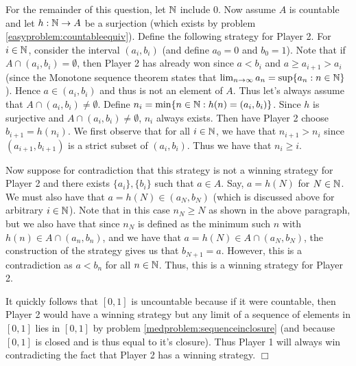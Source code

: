 \documentclass{article}
\begin{document}
{    For the remainder of this question, let $\mathbb{N}$ include 0. Now assume $A$ is countable and let $h: \mathbb{N}\to A$ be a surjection (which exists by problem \ref{easyproblem:countableequiv}). Define the following strategy for Player 2. For $i\in \mathbb{N}$, consider the interval $(a_{i}, b_{i})$ (and define $a_{0} = 0$ and $b_{0} = 1$). Note that if $A \cap (a_{i}, b_{i}) = \emptyset$, then Player 2 has already won since $a < b_{i}$ and $a \geq a_{i+1} > a_{i}$ (since the Monotone sequence theorem states that $\lim_{n\to\infty} a_{n} = \sup\{a_{n}:n\in\mathbb{N}\}$). Hence $a\in (a_{i}, b_{i})$ and thus is not an element of $A$. Thus let's always assume that $A\cap (a_{i}, b_{i})\neq \emptyset$. Define $n_{i} = \min\{n\in \mathbb{N}: h(n) = (a_{i}, b_{i})\}$. Since $h$ is surjective and $A\cap (a_{i}, b_{i})\neq \emptyset$, $n_{i}$ always exists. Then have Player 2 choose $b_{i+1} = h(n_{i})$. We first observe that for all $i\in \mathbb{N}$, we have that $n_{i+1} > n_{i}$ since $(a_{i+1}, b_{i+1})$ is a strict subset of $(a_{i}, b_{i})$. Thus we have that $n_{i} \geq i$. 

    Now suppose for contradiction that this strategy is not a winning strategy for Player 2 and there exists $\{a_{i}\}, \{b_{i}\}$ such that $a\in A$. Say, $a = h(N)$ for $N\in \mathbb{N}$. We must also have that $a = h(N) \in (a_{N}, b_{N})$ (which is discussed above for arbitrary $i\in \mathbb{N}$). Note that in this case $n_{N} \geq N$ as shown in the above paragraph, but we also have that since $n_{N}$ is defined as the minimum such $n$ with $h(n) \in A\cap (a_{n}, b_{n})$, and we have that $a = h(N)\in A \cap (a_{N}, b_{N})$, the construction of the strategy gives us that $b_{N+1} = a$. However, this is a contradiction as $a < b_{n}$ for all $n\in \mathbb{N}$. Thus, this is a winning strategy for Player 2. 
    
    It quickly follows that $[0,1]$ is uncountable because if it were countable, then Player 2 would have a winning strategy but any limit of a sequence of elements in $[0,1]$ lies in $[0,1]$ by problem \ref{medproblem:sequenceinclosure} (and because $[0,1]$ is closed and is thus equal to it's closure). Thus Player 1 will always win contradicting the fact that Player 2 has a winning strategy. $\Box$
}
\end{document}
